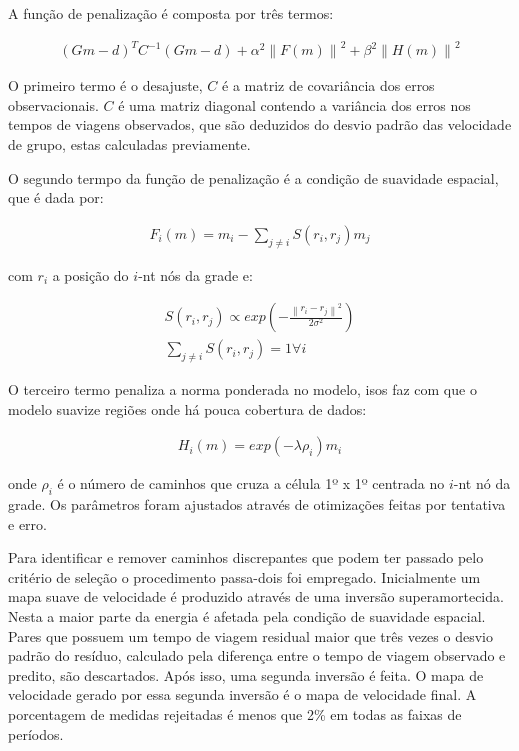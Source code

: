A função de penalização é composta por três termos:

\begin{eqnarray}
(Gm-d)^{T}C^{-1}(Gm-d) + \alpha ^{2} \left \| F(m)  \right \| ^{2} + \beta ^{2 } \left \| H(m)  \right \| ^{2}
\end{eqnarray}

O primeiro termo é o desajuste, $C$ é a matriz de covariância dos erros observacionais. $C$ é uma matriz diagonal contendo a variância dos erros nos tempos de viagens observados, que são deduzidos do desvio padrão das velocidade de grupo, estas calculadas previamente. 

O segundo termpo da função de penalização é a condição de suavidade espacial, que é dada por:

\begin{eqnarray}
F_{i}(m)=m_{i}-\sum_{j\neq i}S(r_{i},r_{j})m_{j}
\end{eqnarray}

com $r_{i}$ a posição do $i$-nt nós da grade e:

\begin{eqnarray}
S(r_{i},r_{j}) \propto exp(- \frac{\left \| r_{i}-r_{j}  \right \|^{2}}{2\sigma ^{2}}) \\
\sum_{j\neq i} S(r_{i},r_{j}) = 1         \forall i 
\end{eqnarray}


O terceiro termo penaliza a norma ponderada no modelo, isos faz com que o modelo suavize regiões onde há pouca cobertura de dados:

\begin{eqnarray}
H_{i}(m) = exp(-\lambda \rho _{i})m_{i}
\end{eqnarray}

onde $\rho _{i}$ é o número de caminhos que cruza a célula 1º x 1º centrada no $i$-nt nó da grade. Os parâmetros foram ajustados através de otimizações feitas por tentativa e erro.

Para identificar e remover caminhos discrepantes que podem ter passado pelo critério de seleção o procedimento passa-dois foi empregado. Inicialmente um mapa suave de velocidade é produzido através de uma inversão superamortecida. Nesta a maior parte da energia é afetada pela condição de suavidade espacial. Pares que possuem um tempo de viagem residual maior que três vezes o desvio padrão do resíduo, calculado pela diferença entre o tempo de viagem observado e predito,  são descartados. Após isso, uma segunda inversão é feita. O mapa de velocidade gerado por essa segunda inversão é o mapa de velocidade final. A porcentagem de medidas rejeitadas é menos que 2\% em todas as faixas de períodos.

